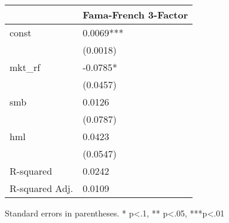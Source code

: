 \begin{table}
\caption{}
\label{}
\begin{center}
\begin{tabular}{ll}
\hline
               & Fama-French 3-Factor  \\
\hline
const          & 0.0069***             \\
               & (0.0018)              \\
mkt\_rf        & -0.0785*              \\
               & (0.0457)              \\
smb            & 0.0126                \\
               & (0.0787)              \\
hml            & 0.0423                \\
               & (0.0547)              \\
R-squared      & 0.0242                \\
R-squared Adj. & 0.0109                \\
\hline
\end{tabular}
\end{center}
\end{table}
\bigskip
Standard errors in parentheses. \newline 
* p<.1, ** p<.05, ***p<.01